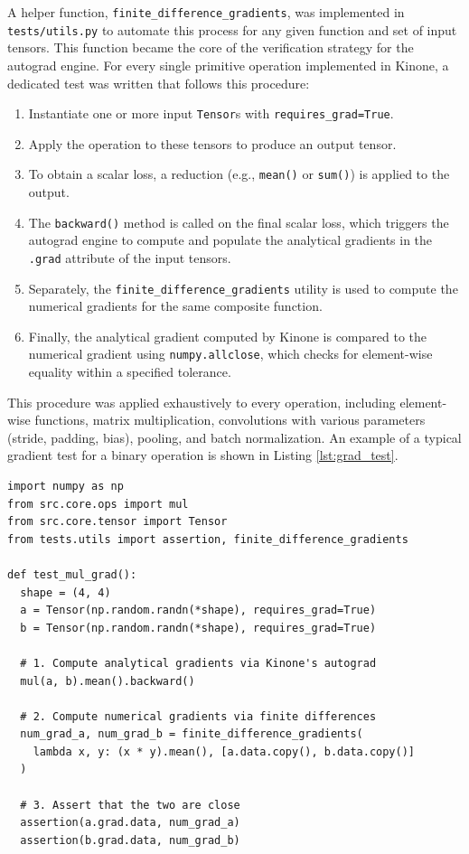 \documentclass[a4paper]{article}
\begin{document}
A helper function, \texttt{finite\_difference\_gradients}, was implemented in \texttt{tests/utils.py} to automate this process for any given function and set of input tensors. This function became the core of the verification strategy for the autograd engine. For every single primitive operation implemented in Kinone, a dedicated test was written that follows this procedure:

\begin{enumerate}
    \item Instantiate one or more input \texttt{Tensor}s with \texttt{requires\_grad=True}.
    \item Apply the operation to these tensors to produce an output tensor.
    \item To obtain a scalar loss, a reduction (e.g., \texttt{mean()} or \texttt{sum()}) is applied to the output.
    \item The \texttt{backward()} method is called on the final scalar loss, which triggers the autograd engine to compute and populate the analytical gradients in the \texttt{.grad} attribute of the input tensors.
    \item Separately, the \texttt{finite\_difference\_gradients} utility is used to compute the numerical gradients for the same composite function.
    \item Finally, the analytical gradient computed by Kinone is compared to the numerical gradient using \texttt{numpy.allclose}, which checks for element-wise equality within a specified tolerance.
\end{enumerate}

This procedure was applied exhaustively to every operation, including element-wise functions, matrix multiplication, convolutions with various parameters (stride, padding, bias), pooling, and batch normalization. An example of a typical gradient test for a binary operation is shown in Listing \ref{lst:grad_test}.

\begin{lstlisting}[caption={Example of a gradient verification test for the \texttt{mul} operation.}, label={lst:grad_test}]
import numpy as np
from src.core.ops import mul
from src.core.tensor import Tensor
from tests.utils import assertion, finite_difference_gradients

def test_mul_grad():
  shape = (4, 4)
  a = Tensor(np.random.randn(*shape), requires_grad=True)
  b = Tensor(np.random.randn(*shape), requires_grad=True)
  
  # 1. Compute analytical gradients via Kinone's autograd
  mul(a, b).mean().backward()
  
  # 2. Compute numerical gradients via finite differences
  num_grad_a, num_grad_b = finite_difference_gradients(
    lambda x, y: (x * y).mean(), [a.data.copy(), b.data.copy()]
  )
  
  # 3. Assert that the two are close
  assertion(a.grad.data, num_grad_a)
  assertion(b.grad.data, num_grad_b)
\end{lstlisting}
\end{document}

